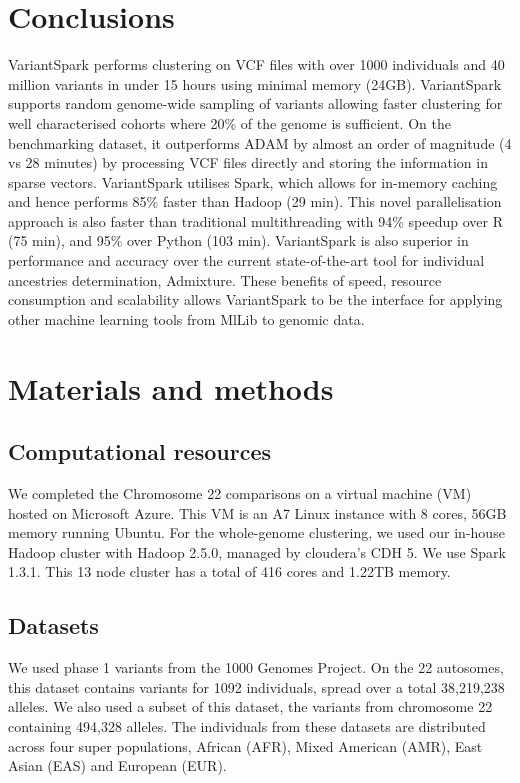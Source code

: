 \documentclass{bmcart}
\newcommand{\variantSpark}{{\sc VariantSpark}}
\begin{document}
\section*{Conclusions}

\variantSpark{} performs clustering on VCF files with over 1000 individuals and 40 million variants in under 15 hours using minimal memory (24GB). 
\variantSpark{} supports random genome-wide sampling of variants allowing faster clustering for well characterised cohorts where 20\% of the genome is sufficient. 
On the benchmarking dataset, it outperforms {\sc ADAM} by almost an order of magnitude (4 vs 28 minutes) by processing VCF files directly and storing the information in sparse vectors. %
\variantSpark{} utilises {\sc Spark}, which allows for in-memory caching and hence performs 85\% faster than Hadoop (29 min).
This novel parallelisation approach is also faster than traditional multithreading with 94\% speedup over R (75 min), and 95\% over Python (103 min).
\variantSpark{} is also superior in performance and accuracy over the current state-of-the-art tool for individual ancestries determination, {\sc Admixture}.
These benefits of speed, resource consumption and scalability allows \variantSpark{} to be the interface for applying other machine learning tools from MlLib to genomic data. 




\section*{Materials and methods}
\subsection*{Computational resources}
We completed the Chromosome 22 comparisons on a virtual machine (VM) hosted on Microsoft Azure. This VM is an A7 Linux instance with 8 cores, 56GB memory running Ubuntu. 
For the whole-genome clustering, we used our in-house Hadoop cluster with Hadoop 2.5.0, managed by cloudera's CDH 5. We use Spark 1.3.1. This 13 node cluster has a total of 416 cores and 1.22TB memory.


\subsection*{Datasets}
We used  phase 1 variants from the 1000 Genomes Project. On the 22 autosomes, this dataset contains variants for 1092 individuals, spread over a total 38,219,238 alleles.
We also used a subset of this dataset, the variants from chromosome 22 containing 494,328 alleles.
The individuals from these datasets are distributed across four super populations, African (AFR), Mixed American (AMR), East Asian (EAS) and European (EUR).
\end{document}
